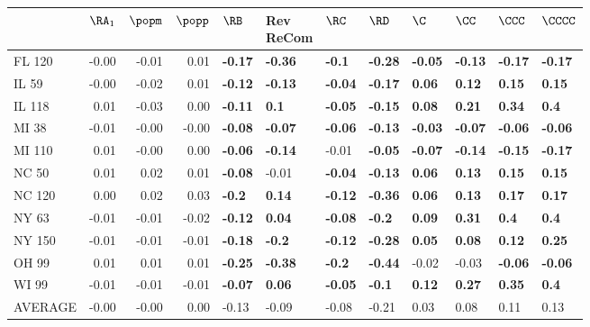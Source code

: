 \begin{tabular}{lrrrllllllll}
\toprule
{} &  $\RA_1$ &  $\popm$ &  $\popp$ &           $\RB$ & \makecell{Rev \\ ReCom} &           $\RC$ &           $\RD$ &            $\C$ &           $\CC$ &          $\CCC$ &         $\CCCC$ \\
\midrule
FL 120  &    -0.00 &    -0.01 &     0.01 &  \textbf{-0.17} &          \textbf{-0.36} &   \textbf{-0.1} &  \textbf{-0.28} &  \textbf{-0.05} &  \textbf{-0.13} &  \textbf{-0.17} &  \textbf{-0.17} \\
IL 59   &    -0.00 &    -0.02 &     0.01 &  \textbf{-0.12} &          \textbf{-0.13} &  \textbf{-0.04} &  \textbf{-0.17} &   \textbf{0.06} &   \textbf{0.12} &   \textbf{0.15} &   \textbf{0.15} \\
IL 118  &     0.01 &    -0.03 &     0.00 &  \textbf{-0.11} &            \textbf{0.1} &  \textbf{-0.05} &  \textbf{-0.15} &   \textbf{0.08} &   \textbf{0.21} &   \textbf{0.34} &    \textbf{0.4} \\
MI 38   &    -0.01 &    -0.00 &    -0.00 &  \textbf{-0.08} &          \textbf{-0.07} &  \textbf{-0.06} &  \textbf{-0.13} &  \textbf{-0.03} &  \textbf{-0.07} &  \textbf{-0.06} &  \textbf{-0.06} \\
MI 110  &     0.01 &    -0.00 &     0.00 &  \textbf{-0.06} &          \textbf{-0.14} &           -0.01 &  \textbf{-0.05} &  \textbf{-0.07} &  \textbf{-0.14} &  \textbf{-0.15} &  \textbf{-0.17} \\
NC 50   &     0.01 &     0.02 &     0.01 &  \textbf{-0.08} &                   -0.01 &  \textbf{-0.04} &  \textbf{-0.13} &   \textbf{0.06} &   \textbf{0.13} &   \textbf{0.15} &   \textbf{0.15} \\
NC 120  &     0.00 &     0.02 &     0.03 &   \textbf{-0.2} &           \textbf{0.14} &  \textbf{-0.12} &  \textbf{-0.36} &   \textbf{0.06} &   \textbf{0.13} &   \textbf{0.17} &   \textbf{0.17} \\
NY 63   &    -0.01 &    -0.01 &    -0.02 &  \textbf{-0.12} &           \textbf{0.04} &  \textbf{-0.08} &   \textbf{-0.2} &   \textbf{0.09} &   \textbf{0.31} &    \textbf{0.4} &    \textbf{0.4} \\
NY 150  &    -0.01 &    -0.01 &    -0.01 &  \textbf{-0.18} &           \textbf{-0.2} &  \textbf{-0.12} &  \textbf{-0.28} &   \textbf{0.05} &   \textbf{0.08} &   \textbf{0.12} &   \textbf{0.25} \\
OH 99   &     0.01 &     0.01 &     0.01 &  \textbf{-0.25} &          \textbf{-0.38} &   \textbf{-0.2} &  \textbf{-0.44} &           -0.02 &           -0.03 &  \textbf{-0.06} &  \textbf{-0.06} \\
WI 99   &    -0.01 &    -0.01 &    -0.01 &  \textbf{-0.07} &           \textbf{0.06} &  \textbf{-0.05} &   \textbf{-0.1} &   \textbf{0.12} &   \textbf{0.27} &   \textbf{0.35} &    \textbf{0.4} \\
AVERAGE &    -0.00 &    -0.00 &     0.00 &           -0.13 &                   -0.09 &           -0.08 &           -0.21 &            0.03 &            0.08 &            0.11 &            0.13 \\
\bottomrule
\end{tabular}
